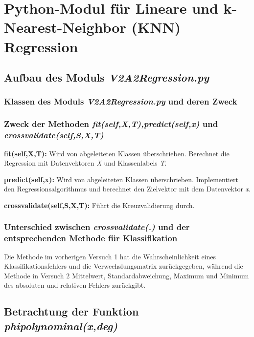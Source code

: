 \section{Python-Modul für Lineare und k-Nearest-Neighbor (KNN) Regression}


\subsection{
    Aufbau des Moduls \textit{V2A2\textunderscore Regression.py}
}

\subsubsection{ Klassen des Moduls \textit{V2A2\textunderscore Regression.py} und deren Zweck}

\subsubsection{ Zweck der Methoden \textit{fit(self,X,T),predict(self,x)} und \textit{crossvalidate(self,S,X,T)}}

\noindent
 \vspace{0px}
\textbf{fit(self,X,T):} Wird von abgeleiteten Klassen überschrieben. Berechnet die Regression mit Datenvektoren \textit{X} und Klassenlabels \textit{T}.

\noindent
 \vspace{0px}
\textbf{predict(self,x):} Wird von abgeleiteten Klassen überschrieben. Implementiert den Regressionsalgorithmus und berechnet den Zielvektor mit dem Datenvektor \textit{x}.

\noindent
 \vspace{0px}
\textbf{crossvalidate(self,S,X,T):} Führt die Kreuzvalidierung durch.


\subsubsection{ Unterschied  zwischen \textit{crossvalidate(.)} und der entsprechenden Methode für Klassifikation}

\noindent
 \vspace{0px}
Die Methode im vorherigen Versuch 1 hat die Wahrscheinlichkeit eines Klassifikationsfehlers und die Verwechslungsmatrix zurückgegeben, während die Methode in Versuch 2 Mittelwert, Standardabweichung, Maximum und Minimum des absoluten und relativen Fehlers zurückgibt. 

\subsection{
    Betrachtung der Funktion \textit{phi\textunderscore polynominal(x,deg)}
}

